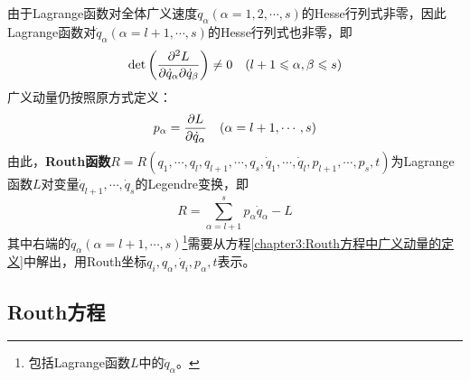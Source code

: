由于Lagrange函数对全体广义速度$\dot{q}_\alpha(\alpha=1,2,\cdots,s)$的Hesse行列式非零，因此Lagrange函数对$\dot{q}_\alpha(\alpha=l+1,\cdots,s)$的Hesse行列式也非零，即
\begin{equation*}
	\det\begin{pmatrix} \dfrac{\partial^2L}{\partial \dot{q}_\alpha\partial \dot{q}_\beta}\end{pmatrix} \neq 0 \quad (l+1\leqslant \alpha,\beta\leqslant s)
\end{equation*}
广义动量仍按照原方式定义：
\begin{equation}
	p_\alpha=\frac{\partial L}{\partial \dot{q}_\alpha} \quad (\alpha=l+1,\cdots,s)
	\label{chapter3:Routh方程中广义动量的定义}
\end{equation}
由此，{\bf Routh函数}$R=R(q_1,\cdots,q_l,q_{l+1},\cdots,q_s,\dot{q}_1,\cdots,\dot{q}_l,p_{l+1},\cdots,p_s,t)$为Lagrange函数$L$对变量$\dot{q}_{l+1},\cdots,\dot{q}_s$的Legendre变换，即
\begin{equation}
	R = \sum_{\alpha=l+1}^sp_\alpha\dot{q}_\alpha-L
	\label{chapter3:Routh函数的定义}
\end{equation}
其中右端的$\dot{q}_\alpha(\alpha=l+1,\cdots,s)$\footnote{包括Lagrange函数$L$中的$\dot{q}_\alpha$。}需要从方程\eqref{chapter3:Routh方程中广义动量的定义}中解出，用Routh坐标$q_i,q_\alpha,\dot{q}_i,p_\alpha,t$表示。

\subsection{Routh方程}

